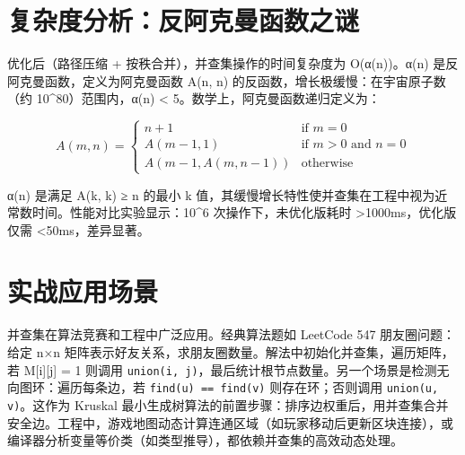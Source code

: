 \chapter{复杂度分析：反阿克曼函数之谜}
优化后（路径压缩 + 按秩合并），并查集操作的时间复杂度为 O(α(n))。α(n) 是反阿克曼函数，定义为阿克曼函数 A(n, n) 的反函数，增长极缓慢：在宇宙原子数（约 10\^{}80）范围内，α(n) < 5。数学上，阿克曼函数递归定义为：\par
$$  A(m, n) = \begin{cases} n+1 & \text{if } m = 0 \\ A(m-1, 1) & \text{if } m > 0 \text{ and } n = 0 \\ A(m-1, A(m, n-1)) & \text{otherwise} \end{cases}  $$\par
α(n) 是满足 A(k, k) ≥ n 的最小 k 值，其缓慢增长特性使并查集在工程中视为近常数时间。性能对比实验显示：10\^{}6 次操作下，未优化版耗时 >1000ms，优化版仅需 <50ms，差异显著。\par
\chapter{实战应用场景}
并查集在算法竞赛和工程中广泛应用。经典算法题如 LeetCode 547 朋友圈问题：给定 n×n 矩阵表示好友关系，求朋友圈数量。解法中初始化并查集，遍历矩阵，若 M[i][j] = 1 则调用 \texttt{union(i, j)}，最后统计根节点数量。另一个场景是检测无向图环：遍历每条边，若 \texttt{find(u) == find(v)} 则存在环；否则调用 \texttt{union(u, v)}。这作为 Kruskal 最小生成树算法的前置步骤：排序边权重后，用并查集合并安全边。工程中，游戏地图动态计算连通区域（如玩家移动后更新区块连接），或编译器分析变量等价类（如类型推导），都依赖并查集的高效动态处理。\par

